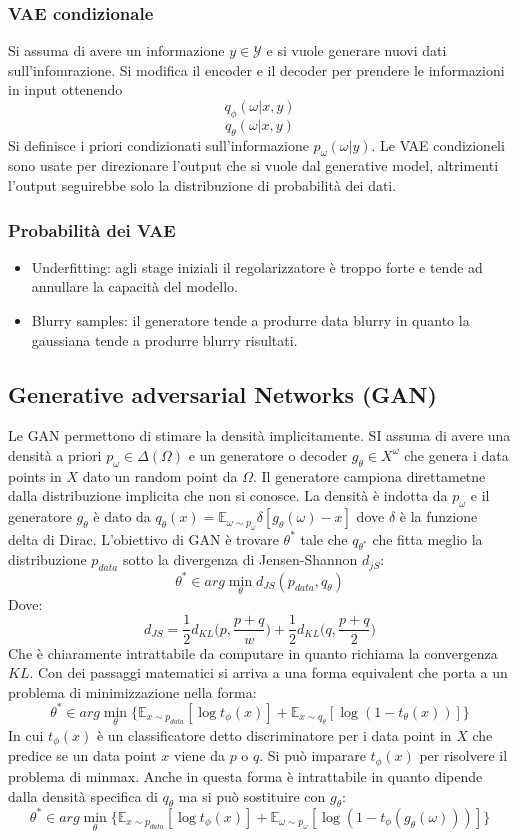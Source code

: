 		\subsubsection{VAE condizionale}
		Si assuma di avere un informazione $y\in\mathcal{Y}$ e si vuole generare nuovi dati sull'infomrazione.
		Si modifica il encoder e il decoder per prendere le informazioni in input ottenendo
		$$q_\phi(\omega|x,y)$$
		$$q_\theta(\omega|x,y)$$
		Si definisce i priori condizionati sull'informazione $p_\omega(\omega|y)$.
		Le VAE condizioneli sono usate per direzionare l'output che si vuole dal generative model, altrimenti l'output seguirebbe solo la distribuzione di probabilit\`a dei dati.

		\subsubsection{Probabilit\`a dei VAE}
		\begin{itemize}
		\item Underfitting: agli stage iniziali il regolarizzatore \`e troppo forte e tende ad annullare la capacit\`a del modello.
		\item Blurry samples: il generatore tende a produrre data blurry in quanto la gaussiana tende a produrre blurry risultati.
	\end{itemize}

	\subsection{Generative adversarial Networks (GAN)}
	Le GAN permettono di stimare la densit\`a implicitamente.
	SI assuma di avere una densit\`a a priori $p_\omega\in\Delta(\Omega)$ e un generatore o decoder $g_\theta\in X^\omega$ che genera i data points in $X$ dato un random point da $\Omega$.
	Il generatore campiona direttametne dalla distribuzione implicita che non si conosce.
	La densit\`a \`e indotta da $p_\omega$ e il generatore $g_\theta$ \`e dato da $q_\theta(x) = \mathbb{E}_{\omega\sim p_\omega}\delta[g_\theta(\omega) - x]$ dove $\delta$ \`e la funzione delta di Dirac.
	L'obiettivo di GAN \`e trovare $\theta^*$ tale che $q_{\theta^*}$ che fitta meglio la distribuzione $p_{data}$ sotto la divergenza di Jensen-Shannon $d_{jS}$:
	$$\theta^*\in arg\min\limits_{\theta} d_{JS}(p_{data},q_\theta)$$
	Dove:
	$$d_{JS} = \frac{1}{2}d_{KL}\bigl(p,\frac{p+q}{w}\bigr)+\frac{1}{2}d_{KL}\bigl(q,\frac{p+q}{2}\bigr)$$
	Che \`e chiaramente intrattabile da computare in quanto richiama la convergenza $KL$.
	Con dei passaggi matematici si arriva a una forma equivalent che porta a un problema di minimizzazione nella forma:
	$$\theta^*\in arg\min\limits_\theta\{\mathbb{E}_{x\sim p_{data}}[\log t_\phi(x)] + \mathbb{E}_{x\sim q_\theta}[\log(1-t_\theta(x))]\}$$
		In cui $t_\phi(x)$ \`e un classificatore detto discriminatore per i data point in $X$ che predice se un data point $x$ viene da $p$ o $q$.
		Si pu\`o imparare $t_\phi(x)$  per risolvere il problema di minmax.
		Anche in questa forma \`e intrattabile in quanto dipende dalla densit\`a specifica di $q_\theta$ ma si pu\`o sostituire con $g_\theta$:
		$$\theta^*\in arg\min\limits_{\theta}\{\mathbb{E}_{x\sim p_{data}}[\log t_\phi(x)]+\mathbb{E}_{\omega\sim p_\omega}[\log(1-t_\phi(g_\theta(\omega)))]\}$$

